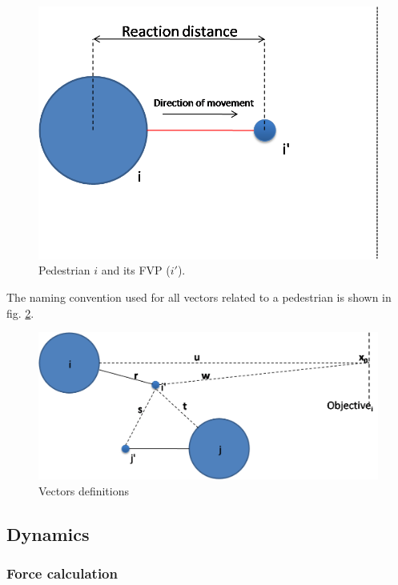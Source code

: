 \documentclass[english]{article}
\begin{document}
    \begin{figure}[h]
        \centering{}
        \includegraphics[scale=0.4]{pics/pedestrian-top} 
        \caption{\label{fig:pedestrian-geometry} Pedestrian $i$ and its FVP ($i'$).}
    \end{figure}
    
    The naming convention used for all vectors related to a pedestrian is shown in 
    fig. \ref{fig:pedestrian-vectors}.
    
    \begin{figure}[h]
        \centering{}
        \includegraphics[scale=0.4]{pics/geometry}
        \caption{\label{fig:pedestrian-vectors} Vectors definitions}
    \end{figure}
    
    \subsection{Dynamics}
    
    \subsubsection{Force calculation}
    
\end{document}
